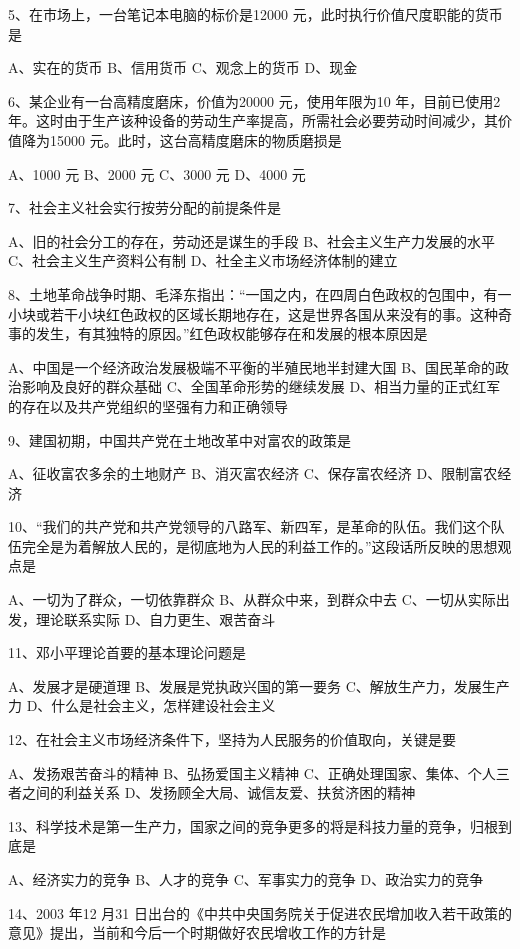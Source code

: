 \documentclass[UTF8,11pt]{ctexart}
\begin{document}
5、在市场上，一台笔记本电脑的标价是12000 元，此时执行价值尺度职能的货币是


A、实在的货币 B、信用货币 C、观念上的货币 D、现金


6、某企业有一台高精度磨床，价值为20000 元，使用年限为10 年，目前已使用2 年。这时由于生产该种设备的劳动生产率提高，所需社会必要劳动时间减少，其价值降为15000 元。此时，这台高精度磨床的物质磨损是


A、1000 元 B、2000 元 C、3000 元 D、4000 元


7、社会主义社会实行按劳分配的前提条件是


A、旧的社会分工的存在，劳动还是谋生的手段 B、社会主义生产力发展的水平 C、社会主义生产资料公有制 D、社全主义市场经济体制的建立


8、土地革命战争时期、毛泽东指出：“一国之内，在四周白色政权的包围中，有一小块或若干小块红色政权的区域长期地存在，这是世界各国从来没有的事。这种奇事的发生，有其独特的原因。”红色政权能够存在和发展的根本原因是


A、中国是一个经济政治发展极端不平衡的半殖民地半封建大国 B、国民革命的政治影响及良好的群众基础 C、全国革命形势的继续发展 D、相当力量的正式红军的存在以及共产党组织的坚强有力和正确领导


9、建国初期，中国共产党在土地改革中对富农的政策是


A、征收富农多余的土地财产 B、消灭富农经济 C、保存富农经济 D、限制富农经济


10、“我们的共产党和共产党领导的八路军、新四军，是革命的队伍。我们这个队伍完全是为着解放人民的，是彻底地为人民的利益工作的。”这段话所反映的思想观点是


A、一切为了群众，一切依靠群众 B、从群众中来，到群众中去 C、一切从实际出发，理论联系实际 D、自力更生、艰苦奋斗


11、邓小平理论首要的基本理论问题是


A、发展才是硬道理 B、发展是党执政兴国的第一要务 C、解放生产力，发展生产力 D、什么是社会主义，怎样建设社会主义


12、在社会主义市场经济条件下，坚持为人民服务的价值取向，关键是要


A、发扬艰苦奋斗的精神 B、弘扬爱国主义精神 C、正确处理国家、集体、个人三者之间的利益关系 D、发扬顾全大局、诚信友爱、扶贫济困的精神


13、科学技术是第一生产力，国家之间的竞争更多的将是科技力量的竞争，归根到底是


A、经济实力的竞争 B、人才的竞争 C、军事实力的竞争 D、政治实力的竞争


14、2003 年12 月31 日出台的《中共中央国务院关于促进农民增加收入若干政策的意见》提出，当前和今后一个时期做好农民增收工作的方针是
\end{document}
